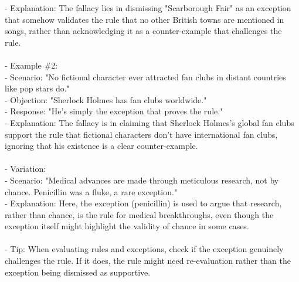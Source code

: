 \documentclass[a4paper,12pt,single,pdftex]{scrartcl}
\begin{document}
    
        - Explanation: The fallacy lies in dismissing "Scarborough Fair" as an exception that somehow validates the rule that no other British towns are mentioned in songs, rather than acknowledging it as a counter-example that challenges the rule.
    \\

    
      
    \\

    
      - Example \#2:
    \\

    
        - Scenario: "No fictional character ever attracted fan clubs in distant countries like pop stars do."
    \\

    
        - Objection: "Sherlock Holmes has fan clubs worldwide."
    \\

    
        - Response: "He’s simply the exception that proves the rule."
    \\

    
        - Explanation: The fallacy is in claiming that Sherlock Holmes’s global fan clubs support the rule that fictional characters don’t have international fan clubs, ignoring that his existence is a clear counter-example.
    \\

    
      
    \\

    
      - Variation:
    \\

    
        - Scenario: "Medical advances are made through meticulous research, not by chance. Penicillin was a fluke, a rare exception."
    \\

    
        - Explanation: Here, the exception (penicillin) is used to argue that research, rather than chance, is the rule for medical breakthroughs, even though the exception itself might highlight the validity of chance in some cases.
    \\

    
      
    \\

    
      - Tip: When evaluating rules and exceptions, check if the exception genuinely challenges the rule. If it does, the rule might need re-evaluation rather than the exception being dismissed as supportive.
    \\
\end{document}
